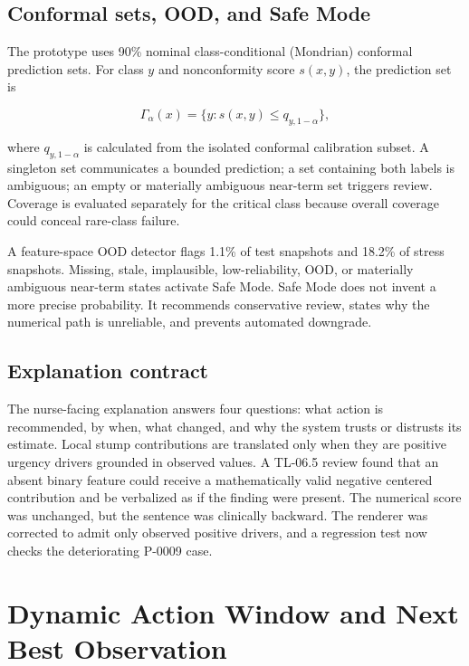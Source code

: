 \documentclass[11pt,a4paper]{article}
\begin{document}
\subsection{Conformal sets, OOD, and Safe Mode}

The prototype uses 90\% nominal class-conditional (Mondrian) conformal prediction sets. For class $y$ and nonconformity score $s(x,y)$, the prediction set is

\begin{equation}
\Gamma_{\alpha}(x)=\{y:s(x,y)\le q_{y,1-\alpha}\},
\end{equation}

where $q_{y,1-\alpha}$ is calculated from the isolated conformal calibration subset. A singleton set communicates a bounded prediction; a set containing both labels is ambiguous; an empty or materially ambiguous near-term set triggers review. Coverage is evaluated separately for the critical class because overall coverage could conceal rare-class failure.

A feature-space OOD detector flags 1.1\% of test snapshots and 18.2\% of stress snapshots. Missing, stale, implausible, low-reliability, OOD, or materially ambiguous near-term states activate Safe Mode. Safe Mode does not invent a more precise probability. It recommends conservative review, states why the numerical path is unreliable, and prevents automated downgrade.

\subsection{Explanation contract}

The nurse-facing explanation answers four questions: what action is recommended, by when, what changed, and why the system trusts or distrusts its estimate. Local stump contributions are translated only when they are positive urgency drivers grounded in observed values. A TL-06.5 review found that an absent binary feature could receive a mathematically valid negative centered contribution and be verbalized as if the finding were present. The numerical score was unchanged, but the sentence was clinically backward. The renderer was corrected to admit only observed positive drivers, and a regression test now checks the deteriorating P-0009 case.

\section{Dynamic Action Window and Next Best Observation}
\end{document}
